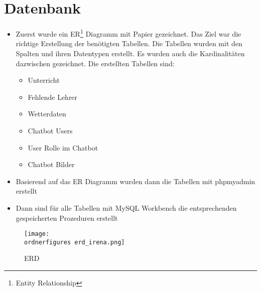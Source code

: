 \section{Datenbank}
\begin{itemize}
	\item Zuerst wurde ein ER\footnote{Entity Relationship} Diagramm mit Papier gezeichnet. Das Ziel war die richtige Erstellung der benötigten Tabellen. Die Tabellen wurden mit den Spalten und ihren Datentypen erstellt. Es wurden auch die Kardinalitäten dazwischen gezeichnet. Die erstellten Tabellen sind:
	
	\begin{itemize}
		\item Unterricht
	\end{itemize}
    \begin{itemize}
    	\item Fehlende Lehrer
    \end{itemize}
    \begin{itemize}
    	\item Wetterdaten
    \end{itemize}
    \begin{itemize}
	\item Chatbot Users
    \end{itemize}	
	\begin{itemize}
		\item User Rolle im Chatbot
	\end{itemize}
	\begin{itemize}
		\item Chatbot Bilder
	\end{itemize}

\end{itemize}
\begin{itemize}
	\item Basierend auf das ER Diagramm wurden dann die Tabellen mit phpmyadmin erstellt
\end{itemize}
\begin{itemize}
	\item Dann sind für alle Tabellen mit MySQL Workbench die entsprechenden gespeicherten Prozeduren erstellt 
\end{itemize}	
\begin{figure}[ht]	
	\texttt{[image: \\ordnerfigures erd\_irena.png]}
	\caption{ERD}
	\label{fig:erd}
\end{figure}
